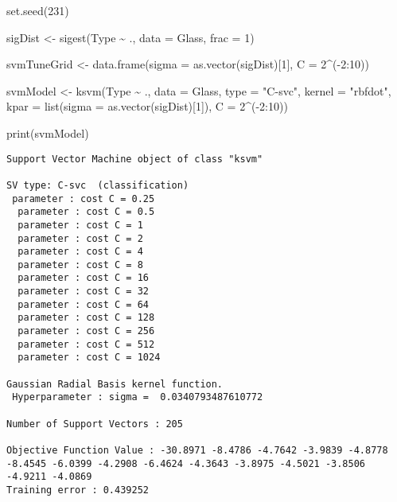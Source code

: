 \documentclass[
  letterpaper,
  DIV=11,
  numbers=noendperiod]{scrartcl}
\newenvironment{Shaded}{\begin{snugshade}}{\end{snugshade}}
\newcommand{\AttributeTok}[1]{\textcolor[rgb]{0.40,0.45,0.13}{#1}}
\newcommand{\DecValTok}[1]{\textcolor[rgb]{0.68,0.00,0.00}{#1}}
\newcommand{\FunctionTok}[1]{\textcolor[rgb]{0.28,0.35,0.67}{#1}}
\newcommand{\NormalTok}[1]{\textcolor[rgb]{0.00,0.23,0.31}{#1}}
\newcommand{\OtherTok}[1]{\textcolor[rgb]{0.00,0.23,0.31}{#1}}
\newcommand{\SpecialCharTok}[1]{\textcolor[rgb]{0.37,0.37,0.37}{#1}}
\newcommand{\StringTok}[1]{\textcolor[rgb]{0.13,0.47,0.30}{#1}}
\begin{document}
\begin{Shaded}
\begin{Highlighting}[]
\FunctionTok{set.seed}\NormalTok{(}\DecValTok{231}\NormalTok{)}

\NormalTok{sigDist }\OtherTok{\textless{}{-}} \FunctionTok{sigest}\NormalTok{(Type }\SpecialCharTok{\textasciitilde{}}\NormalTok{ ., }\AttributeTok{data =}\NormalTok{ Glass, }\AttributeTok{frac =} \DecValTok{1}\NormalTok{)}

\NormalTok{svmTuneGrid }\OtherTok{\textless{}{-}} \FunctionTok{data.frame}\NormalTok{(}\AttributeTok{sigma =} \FunctionTok{as.vector}\NormalTok{(sigDist)[}\DecValTok{1}\NormalTok{], }\AttributeTok{C =} \DecValTok{2}\SpecialCharTok{\^{}}\NormalTok{(}\SpecialCharTok{{-}}\DecValTok{2}\SpecialCharTok{:}\DecValTok{10}\NormalTok{))}

\NormalTok{svmModel }\OtherTok{\textless{}{-}} \FunctionTok{ksvm}\NormalTok{(Type }\SpecialCharTok{\textasciitilde{}}\NormalTok{ ., }\AttributeTok{data =}\NormalTok{ Glass, }\AttributeTok{type =} \StringTok{"C{-}svc"}\NormalTok{, }\AttributeTok{kernel =} \StringTok{"rbfdot"}\NormalTok{, }\AttributeTok{kpar =} \FunctionTok{list}\NormalTok{(}\AttributeTok{sigma =} \FunctionTok{as.vector}\NormalTok{(sigDist)[}\DecValTok{1}\NormalTok{]), }\AttributeTok{C =} \DecValTok{2}\SpecialCharTok{\^{}}\NormalTok{(}\SpecialCharTok{{-}}\DecValTok{2}\SpecialCharTok{:}\DecValTok{10}\NormalTok{))}

\FunctionTok{print}\NormalTok{(svmModel)}
\end{Highlighting}
\end{Shaded}

\begin{verbatim}
Support Vector Machine object of class "ksvm" 

SV type: C-svc  (classification) 
 parameter : cost C = 0.25 
  parameter : cost C = 0.5 
  parameter : cost C = 1 
  parameter : cost C = 2 
  parameter : cost C = 4 
  parameter : cost C = 8 
  parameter : cost C = 16 
  parameter : cost C = 32 
  parameter : cost C = 64 
  parameter : cost C = 128 
  parameter : cost C = 256 
  parameter : cost C = 512 
  parameter : cost C = 1024 

Gaussian Radial Basis kernel function. 
 Hyperparameter : sigma =  0.0340793487610772 

Number of Support Vectors : 205 

Objective Function Value : -30.8971 -8.4786 -4.7642 -3.9839 -4.8778 -8.4545 -6.0399 -4.2908 -6.4624 -4.3643 -3.8975 -4.5021 -3.8506 -4.9211 -4.0869 
Training error : 0.439252 
\end{verbatim}
\end{document}

